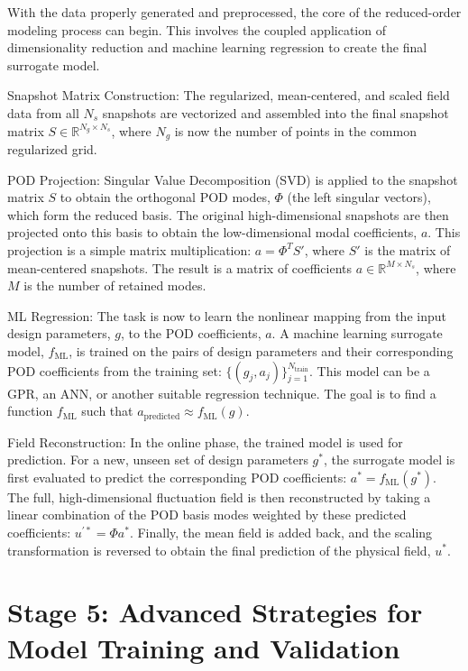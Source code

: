 \documentclass[dscexam, EN]{ufabcFHZh}
\begin{document}
With the data properly generated and preprocessed, the core of the reduced-order modeling process can begin. This involves the coupled application of dimensionality reduction and machine learning regression to create the final surrogate model.

Snapshot Matrix Construction: The regularized, mean-centered, and scaled field data from all $N_s$ snapshots are vectorized and assembled into the final snapshot matrix $S \in \mathbb{R}^{N_g \times N_s}$, where $N_g$ is now the number of points in the common regularized grid.

POD Projection: Singular Value Decomposition (SVD) is applied to the snapshot matrix $S$ to obtain the orthogonal POD modes, $\Phi$ (the left singular vectors), which form the reduced basis. The original high-dimensional snapshots are then projected onto this basis to obtain the low-dimensional modal coefficients, $a$. This projection is a simple matrix multiplication: $a = \Phi^T S'$, where $S'$ is the matrix of mean-centered snapshots. The result is a matrix of coefficients $a \in \mathbb{R}^{M \times N_s}$, where $M$ is the number of retained modes.


ML Regression: The task is now to learn the nonlinear mapping from the input design parameters, $g$, to the POD coefficients, $a$. A machine learning surrogate model, $f_{\text{ML}}$, is trained on the pairs of design parameters and their corresponding POD coefficients from the training set: $\{(g_j, a_j)\}_{j=1}^{N_{\text{train}}}$. This model can be a GPR, an ANN, or another suitable regression technique. The goal is to find a function $f_{\text{ML}}$ such that $a_{\text{predicted}} \approx f_{\text{ML}}(g)$.

Field Reconstruction: In the online phase, the trained model is used for prediction. For a new, unseen set of design parameters $g^*$, the surrogate model is first evaluated to predict the corresponding POD coefficients: $a^{*} = f_{\text{ML}}(g^{*})$. The full, high-dimensional fluctuation field is then reconstructed by taking a linear combination of the POD basis modes weighted by these predicted coefficients: $u^{\prime *} = \Phi a^{*}$. Finally, the mean field is added back, and the scaling transformation is reversed to obtain the final prediction of the physical field, $u^{*}$.

\section{Stage 5: Advanced Strategies for Model Training and Validation}
\end{document}
